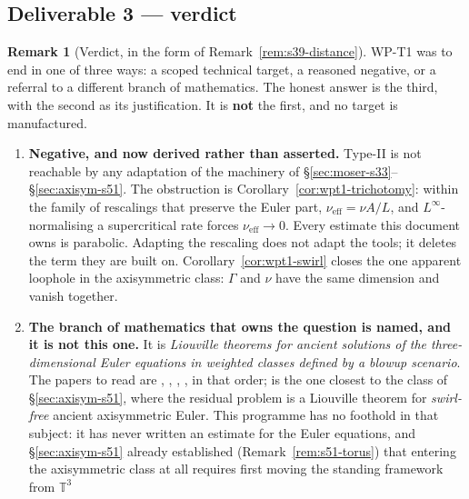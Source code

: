 \documentclass[11pt]{article}
\theoremstyle{definition}
\newtheorem{remark}[theorem]{Remark}
\theoremstyle{remark}
\newcommand{\T}{\mathbb{T}}
\begin{document}
\subsection{Deliverable 3 --- verdict}
\label{subsec:wpt1-verdict}

\begin{remark}[Verdict, in the form of Remark~\ref{rem:s39-distance}]
  \label{rem:wpt1-verdict}
  WP-T1 was to end in one of three ways: a scoped technical target, a
  reasoned negative, or a referral to a different branch of mathematics. The
  honest answer is the third, with the second as its justification. It is
  \textbf{not} the first, and no target is manufactured.
  \begin{enumerate}[label=(\arabic*)]
    \item \textbf{Negative, and now derived rather than asserted.} Type-II is
      not reachable by any adaptation of the machinery of
      \S\ref{sec:moser-s33}--\S\ref{sec:axisym-s51}. The obstruction is
      Corollary~\ref{cor:wpt1-trichotomy}: within the family of rescalings
      that preserve the Euler part, $\nu_{\mathrm{eff}}=\nu A/L$, and
      $L^\infty$-normalising a supercritical rate forces
      $\nu_{\mathrm{eff}}\to0$. Every estimate this document owns is
      parabolic. Adapting the rescaling does not adapt the tools; it deletes
      the term they are built on. Corollary~\ref{cor:wpt1-swirl} closes the
      one apparent loophole in the axisymmetric class:
      $\Gamma$ and $\nu$ have the same dimension and vanish together.
    \item \textbf{The branch of mathematics that owns the question is named,
      and it is not this one.} It is \emph{Liouville theorems for ancient
      solutions of the three-dimensional Euler equations in weighted classes
      defined by a blowup scenario}. The papers to read are
      \cite{Seregin2024TypeII}, \cite{Seregin2026Axisym},
      \cite{Seregin2026Scenarios}, \cite{Seregin2026Potential}, in that
      order; \cite{Seregin2026Axisym} is the one closest to the class of
      \S\ref{sec:axisym-s51}, where the residual problem is a Liouville
      theorem for \emph{swirl-free} ancient axisymmetric Euler. This
      programme has no foothold in that subject: it has never written an
      estimate for the Euler equations, and \S\ref{sec:axisym-s51} already
      established (Remark~\ref{rem:s51-torus}) that entering the axisymmetric
      class at all requires first moving the standing framework from $\T^3$

\end{enumerate}
\end{remark}
\end{document}
